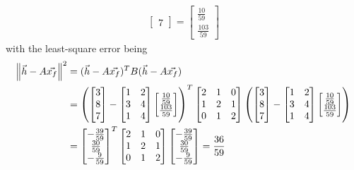 \begin{solution}
\begin{align*}
\begin{bmatrix}
7
\end{bmatrix}
=
\begin{bmatrix}
\frac{10}{59} \\
\frac{103}{59}
\end{bmatrix}
\end{align*}
with the least-square error being
\begin{align*}
\norm{\vec{h}-A\vec{x_f}}^2 &=
(\vec{h}-A\vec{x_f})^T B (\vec{h}-A\vec{x_f})\\
&=
\left(\begin{bmatrix}
3 \\
8 \\
7
\end{bmatrix}-
\begin{bmatrix}
1 & 2 \\
3 & 4 \\
1 & 4
\end{bmatrix}
\begin{bmatrix}
\frac{10}{59} \\
\frac{103}{59}
\end{bmatrix}\right)^T
\begin{bmatrix}
2&1&0\\ 
1&2&1\\
0&1&2
\end{bmatrix}
\left(\begin{bmatrix}
3 \\
8 \\
7
\end{bmatrix}-
\begin{bmatrix}
1 & 2 \\
3 & 4 \\
1 & 4
\end{bmatrix}
\begin{bmatrix}
\frac{10}{59} \\
\frac{103}{59}
\end{bmatrix}\right) \\
&=
\begin{bmatrix}
-\frac{39}{59}\\ 
\frac{30}{59}\\ 
-\frac{9}{59}
\end{bmatrix}^T
\begin{bmatrix}
2&1&0\\ 
1&2&1\\
0&1&2
\end{bmatrix}
\begin{bmatrix}
-\frac{39}{59}\\ 
\frac{30}{59}\\ 
-\frac{9}{59}
\end{bmatrix}
= \frac{36}{59}
\end{align*}
\end{solution}
